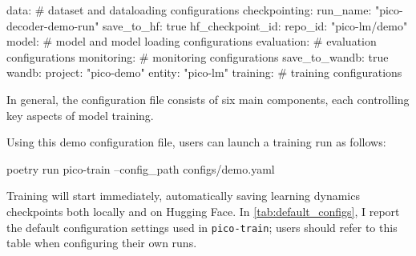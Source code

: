 \begin{center}
    \begin{configlisting}
        data: # dataset and dataloading configurations
        checkpointing:
            run_name: "pico-decoder-demo-run"
            save_to_hf: true
            hf_checkpoint_id:
                repo_id: "pico-lm/demo"
        model: # model and model loading configurations
        evaluation: # evaluation configurations
        monitoring: # monitoring configurations
            save_to_wandb: true
            wandb:
                project: "pico-demo"
                entity: "pico-lm"
        training: # training configurations
    \end{configlisting}
\end{center}

In general, the configuration file consists of six main components, each controlling key aspects of model training. 

Using this demo configuration file, users can launch a training run as follows:

\begin{center}
    \begin{codelisting}
        poetry run pico-train --config_path configs/demo.yaml
    \end{codelisting}
\end{center}

Training will start immediately, automatically saving learning dynamics checkpoints both locally and on Hugging Face. In \cref{tab:default_configs}, I report the default configuration settings used in \texttt{pico-train}; users should refer to this table when configuring their own runs.

